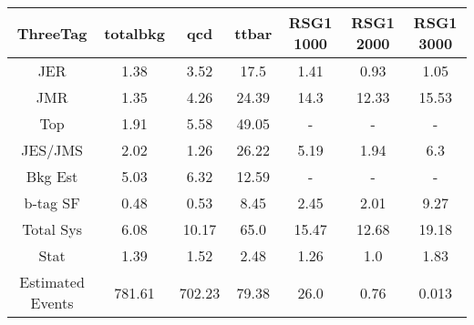\begin{footnotesize} 
\begin{tabular}{c|c|c|c|c|c|c} 
ThreeTag & totalbkg & qcd & ttbar & RSG1 1000 & RSG1 2000 & RSG1 3000 \\ 
\hline\hline 
JER & 1.38 & 3.52 & 17.5 & 1.41 & 0.93 & 1.05\\ 
JMR & 1.35 & 4.26 & 24.39 & 14.3 & 12.33 & 15.53\\ 
Top & 1.91 & 5.58 & 49.05 &  -  &  -  &  - \\ 
JES/JMS & 2.02 & 1.26 & 26.22 & 5.19 & 1.94 & 6.3\\ 
Bkg Est & 5.03 & 6.32 & 12.59 &  -  &  -  &  - \\ 
b-tag SF & 0.48 & 0.53 & 8.45 & 2.45 & 2.01 & 9.27\\ 
\hline 
Total Sys & 6.08 & 10.17 & 65.0 & 15.47 & 12.68 & 19.18\\ 
\hline 
Stat & 1.39 & 1.52 & 2.48 & 1.26 & 1.0 & 1.83\\ 
\hline 
Estimated Events & 781.61 & 702.23 & 79.38 & 26.0 & 0.76 & 0.013\\ 
\hline\hline 
\end{tabular} 
\end{footnotesize} 
\newline 
